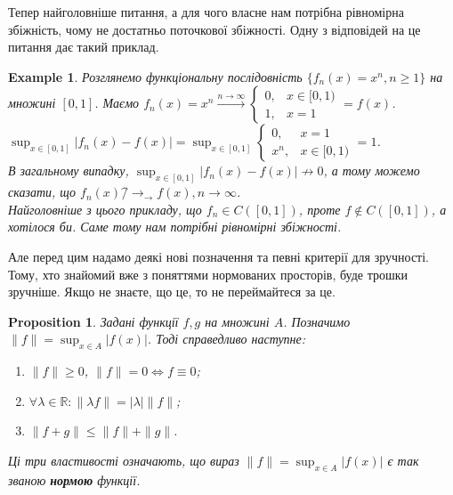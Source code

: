 \documentclass[a4paper, 10pt]{article}
\def\huge{\displaystyle}
\theoremstyle{theoremdd}
\theoremstyle{theoremdd}
\theoremstyle{theoremdd}
\theoremstyle{theoremdd}
\theoremstyle{theoremdd}
\newtheorem{example}[theorem]{Example}
\theoremstyle{theoremdd}
\newtheorem{proposition}[theorem]{Proposition}
\theoremstyle{theoremdd}
\theoremstyle{theoremdd}
\theoremstyle{theoremdd}
\begin{document}
Тепер найголовніше питання, а для чого власне нам потрібна рівномірна збіжність, чому не достатньо поточкової збіжності. Одну з відповідей на це питання дає такий приклад.

\begin{example}
Розглянемо функціональну послідовність $\{f_n(x) = x^n, n \geq 1\}$ на множині $[0,1]$. Маємо $f_n(x) = x^n \overset{n \to \infty}{\longrightarrow} \begin{cases} 0, & x \in [0,1) \\ 1, & x = 1 \end{cases} = f(x)$.\\
$\huge\sup_{x \in [0,1]} |f_n(x)-f(x)| = \sup_{x \in [0,1]}\begin{cases} 0, & x = 1 \\ x^n, & x \in [0,1) \end{cases} = 1$.\\
В загальному випадку, $\huge\sup_{x \in [0,1]} |f_n(x)-f(x)| \not\to 0$, а тому можемо сказати, що $f_n(x) \not^\rightarrow_\rightarrow f(x), n \to \infty$.\\
Найголовніше з цього прикладу, що $f_n \in C([0,1])$, проте $f \not\in C([0,1])$, а хотілося би. Саме тому нам потрібні рівномірні збіжності.
\end{example}

Але перед цим надамо деякі нові позначення та певні критерії для зручності. Тому, хто знайомий вже з поняттями нормованих просторів, буде трошки зручніше. Якщо не знаєте, що це, то не переймайтеся за це.

\begin{proposition}
Задані функції $f,g$ на множині $A$. Позначимо $\|f\| = \displaystyle\sup_{x \in A }|f(x)|$. Тоді справедливо наступне:
\begin{enumerate}[nosep,wide=0pt,label={\arabic*)}]
\item $\|f\| \geq 0$, \qquad $\|f\| = 0 \iff f \equiv 0$;
\item $\forall \lambda \in \mathbb{R}: \| \lambda f\| = |\lambda| \|f\|$;
\item $\|f+g\| \leq \|f\| + \|g\|$.
\end{enumerate}
Ці три властивості означають, що вираз $\|f\| = \displaystyle\sup_{x \in A} |f(x)|$ є так званою \textbf{нормою} функції.

\end{proposition}
\end{document}
